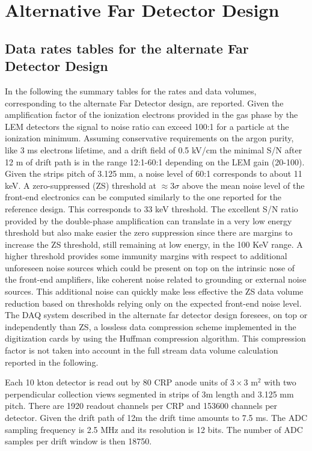 \chapter{Alternative Far Detector Design}
\label{ch:alt-annex-rate}

\section{Data rates tables for the alternate Far Detector Design}

In the following the summary tables for the rates and data volumes, corresponding to the alternate Far Detector design, are reported.
Given the amplification factor of the ionization electrons provided in the gas phase by the LEM detectors the signal to noise ratio can exceed 100:1
for a particle at the ionization minimum. Assuming conservative requirements on the argon purity, like 3 ms electrons lifetime, and a drift field of 0.5 kV/cm 
the minimal S/N after 12 m of drift path is in the range 12:1-60:1 depending on the LEM gain  (20-100). Given the strips pitch of 3.125 mm, 
a noise level of 60:1 corresponds to about 11 keV.  A zero-suppressed (ZS) threshold at $\approx 3\sigma$ above the mean noise level of the front-end electronics can be computed similarly to the one reported for the reference design. This corresponds to 33 keV threshold. The excellent S/N ratio provided by the double-phase amplification can translate in a very low energy threshold but also make easier the zero suppression since there are margins to increase the ZS threshold, still remaining at low energy, in the 100 KeV range. A higher threshold provides some immunity margins with respect to additional unforeseen noise sources which could be present on top on the intrinsic nose of the front-end amplifiers, like coherent noise related to grounding or external noise sources. This additional noise can quickly make less effective the ZS data volume reduction based on thresholds relying only on the expected front-end noise level. The DAQ system described in the alternate far detector design foresees, on top or independently than ZS, a lossless data compression scheme implemented in the digitization cards by using the Huffman compression algorithm. This compression factor is not taken into account in the full stream data volume calculation reported in the following.

Each 10 kton detector is read out by 80 CRP anode units of $3 \times 3$ m$^2$ with two perpendicular collection views segmented in strips of 3m length and 3.125 mm pitch.  There are 1920 readout channels per CRP and 153600 channels per detector. Given the drift path of 12m the drift time amounts to 7.5 ms.  The ADC sampling frequency is 2.5 MHz and its resolution is 12 bits. The number of ADC samples per drift window is then 18750.

